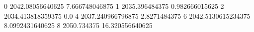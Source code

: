 0 2042.08056640625 7.666748046875
1 2035.396484375 0.982666015625
2 2034.413818359375 0.0
4 2037.240966796875 2.8271484375
6 2042.5130615234375 8.0992431640625
8 2050.734375 16.320556640625
